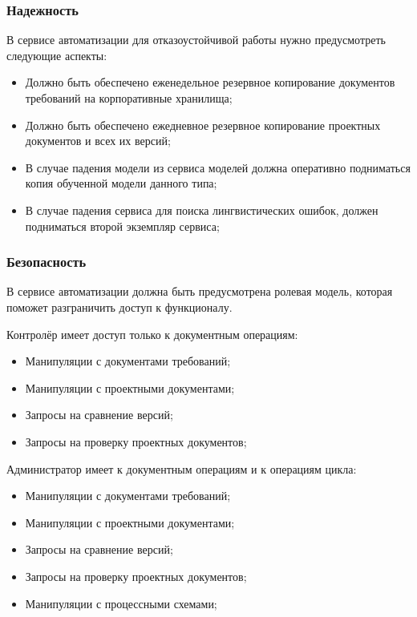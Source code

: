 \subsubsection{Надежность}
В сервисе автоматизации для отказоустойчивой работы нужно предусмотреть следующие аспекты:
\begin{itemize}[nosep, leftmargin=*, labelindent=\parindent]
  \item Должно быть обеспечено еженедельное резервное копирование документов требований на корпоративные хранилища;
  \item Должно быть обеспечено ежедневное резервное копирование проектных документов и всех их версий;
  \item В случае падения модели из сервиса моделей должна оперативно подниматься копия обученной модели данного типа;
  \item В случае падения сервиса для поиска лингвистических ошибок, должен подниматься второй экземпляр сервиса;
\end{itemize}

\subsubsection{Безопасность}
В сервисе автоматизации должна быть предусмотрена ролевая модель, которая поможет разграничить доступ к функционалу.

Контролёр имеет доступ только к документным операциям:
\begin{itemize}[nosep, leftmargin=*, labelindent=\parindent]
  \item Манипуляции с документами требований;
  \item Манипуляции с проектными документами;
  \item Запросы на сравнение версий;
  \item Запросы на проверку проектных документов;
\end{itemize}

Администратор имеет к документным операциям и к операциям цикла:
\begin{itemize}[nosep, leftmargin=*, labelindent=\parindent]
  \item Манипуляции с документами требований;
  \item Манипуляции с проектными документами;
  \item Запросы на сравнение версий;
  \item Запросы на проверку проектных документов;
  \item Манипуляции с процессными схемами;
\end{itemize}

